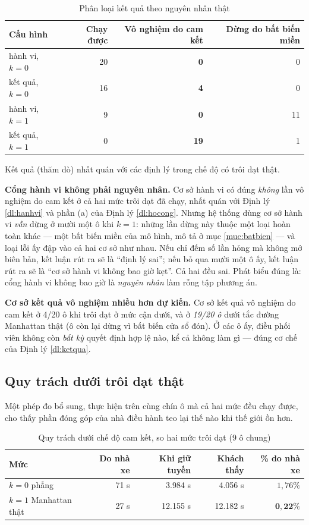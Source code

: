 \begin{table}[htbp]
\centering
\caption{Phân loại kết quả theo nguyên nhân thật}
\label{bang:phanloai}
\small
\begin{tabular}{@{}lrrr@{}}
\toprule
\textbf{Cấu hình} & \textbf{Chạy được} & \textbf{Vô nghiệm do cam kết} & \textbf{Dừng do bất biến miền}\\
\midrule
hành vi, $k=0$ & 20 & \textbf{0} & 0\\
kết quả, $k=0$ & 16 & \textbf{4} & 0\\
hành vi, $k=1$ & 9 & \textbf{0} & 11\\
kết quả, $k=1$ & 0 & \textbf{19} & 1\\
\bottomrule
\end{tabular}
\end{table}

Kết quả (thăm dò) nhất quán với các định lý trong chế độ có trôi dạt thật.

\textbf{Cổng hành vi không phải nguyên nhân.} Cơ sở hành vi có đúng \emph{không} lần vô nghiệm do
cam kết ở cả hai mức trôi dạt đã chạy, nhất quán với Định lý \ref{dl:hanhvi} và phần (a) của Định
lý \ref{dl:hocong}. Nhưng hệ thống dùng cơ sở hành vi \emph{vẫn} dừng ở mười một ô khi $k=1$: những
lần dừng này thuộc một loại hoàn toàn khác --- một bất biến miền của mô hình, mô tả ở mục
\ref{muc:batbien} --- và loại lỗi ấy đập vào cả hai cơ sở như nhau. Nếu chỉ đếm số lần hỏng mà
không mở biên bản, kết luận rút ra sẽ là ``định lý sai''; nếu bỏ qua mười một ô ấy, kết luận rút
ra sẽ là ``cơ sở hành vi không bao giờ kẹt''. Cả hai đều sai. Phát biểu đúng là: cổng hành vi
không bao giờ là \emph{nguyên nhân} làm rỗng tập phương án.

\textbf{Cơ sở kết quả vô nghiệm nhiều hơn dự kiến.} Cơ sở kết quả vô nghiệm do cam kết ở 4/20 ô
khi trôi dạt ở mức cận dưới, và ở \emph{19/20 ô} dưới tắc đường Manhattan thật (ô còn lại dừng vì
bất biến cửa sổ đón). Ở các ô ấy, điều phối viên không còn \emph{bất kỳ} quyết định hợp lệ nào,
kể cả không làm gì --- đúng cơ chế của Định lý \ref{dl:ketqua}.

\subsection{Quy trách dưới trôi dạt thật}

Một phép đo bổ sung, thực hiện trên cùng chín ô mà cả hai mức đều chạy được, cho thấy phần đóng
góp của nhà điều hành teo lại thế nào khi thế giới ồn hơn.

\begin{table}[htbp]
\centering
\caption{Quy trách dưới chế độ cam kết, so hai mức trôi dạt (9 ô chung)}
\label{bang:quytrach-troidat}
\small
\begin{tabular}{@{}lrrrr@{}}
\toprule
\textbf{Mức} & \textbf{Do nhà xe} & \textbf{Khi giữ tuyến} & \textbf{Khách thấy} & \textbf{\% do nhà xe}\\
\midrule
$k=0$ phẳng & 71 s & 3.984 s & 4.056 s & $1{,}76\%$\\
$k=1$ Manhattan thật & 27 s & 12.155 s & 12.182 s & $\mathbf{0{,}22\%}$\\
\bottomrule
\end{tabular}
\end{table}

